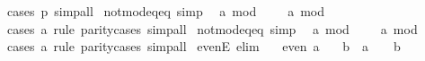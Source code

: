 \begin{isabellebody}
\ {\isacharparenleft}{\kern0pt}cases\ p{\isacharparenright}{\kern0pt}\ simp{\isacharunderscore}{\kern0pt}all%
\endisatagproof
{\isafoldproof}%
%
\isadelimproof
\isanewline
%
\endisadelimproof
\isanewline
{}\isamarkupfalse%
\ not{\isacharunderscore}{\kern0pt}mod{\isacharunderscore}{\kern0pt}{}{\isacharunderscore}{\kern0pt}eq{\isacharunderscore}{\kern0pt}{}{\isacharunderscore}{\kern0pt}eq{\isacharunderscore}{\kern0pt}{}\ {\isacharbrackleft}{\kern0pt}simp{\isacharbrackright}{\kern0pt}{\isacharcolon}{\kern0pt}\isanewline
\ \ {\isachardoublequoteopen}a\ mod\ {}\ {\isasymnoteq}\ {}\ {\isasymlongleftrightarrow}\ a\ mod\ {}\ {\isacharequal}{\kern0pt}\ {}{\isachardoublequoteclose}\isanewline
%
\isadelimproof
\ \ %
\endisadelimproof
%
\isatagproof
{}\isamarkupfalse%
\ {\isacharparenleft}{\kern0pt}cases\ a\ rule{\isacharcolon}{\kern0pt}\ parity{\isacharunderscore}{\kern0pt}cases{\isacharparenright}{\kern0pt}\ simp{\isacharunderscore}{\kern0pt}all%
\endisatagproof
{\isafoldproof}%
%
\isadelimproof
\isanewline
%
\endisadelimproof
\isanewline
{}\isamarkupfalse%
\ not{\isacharunderscore}{\kern0pt}mod{\isacharunderscore}{\kern0pt}{}{\isacharunderscore}{\kern0pt}eq{\isacharunderscore}{\kern0pt}{}{\isacharunderscore}{\kern0pt}eq{\isacharunderscore}{\kern0pt}{}\ {\isacharbrackleft}{\kern0pt}simp{\isacharbrackright}{\kern0pt}{\isacharcolon}{\kern0pt}\isanewline
\ \ {\isachardoublequoteopen}a\ mod\ {}\ {\isasymnoteq}\ {}\ {\isasymlongleftrightarrow}\ a\ mod\ {}\ {\isacharequal}{\kern0pt}\ {}{\isachardoublequoteclose}\isanewline
%
\isadelimproof
\ \ %
\endisadelimproof
%
\isatagproof
{}\isamarkupfalse%
\ {\isacharparenleft}{\kern0pt}cases\ a\ rule{\isacharcolon}{\kern0pt}\ parity{\isacharunderscore}{\kern0pt}cases{\isacharparenright}{\kern0pt}\ simp{\isacharunderscore}{\kern0pt}all%
\endisatagproof
{\isafoldproof}%
%
\isadelimproof
\isanewline
%
\endisadelimproof
\isanewline
{}\isamarkupfalse%
\ evenE\ {\isacharbrackleft}{\kern0pt}elim{\isacharquery}{\kern0pt}{\isacharbrackright}{\kern0pt}{\isacharcolon}{\kern0pt}\isanewline
\ \ \ {\isachardoublequoteopen}even\ a{\isachardoublequoteclose}\isanewline
\ \ \ b\ \ {\isachardoublequoteopen}a\ {\isacharequal}{\kern0pt}\ {}\ {\isacharasterisk}{\kern0pt}\ b{\isachardoublequoteclose}\isanewline
%
\isadelimproof
\ \ %
\endisadelimproof

\end{isabellebody}

